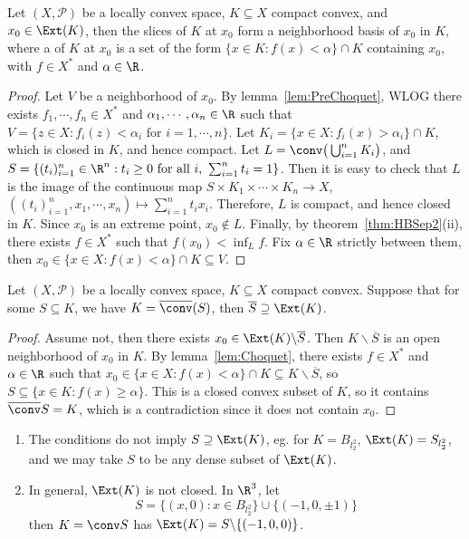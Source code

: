 \documentclass[a4paper]{article}
\begin{document}
\begin{nlemma}\label{lem:Choquet}
  Let $(X,\mathcal{P})$ be a locally convex space, $K\subseteq X$ compact convex, and $x_0\in\Ext(K)$, then the slices of $K$ at $x_0$ form a neighborhood basis of $x_0$ in $K$, where a  of $K$ at $x_0$ is a set of the form $\{x\in K:f(x)<\alpha\}\cap K$ containing $x_0$, with $f\in X^*$ and $\alpha\in\R$.
\end{nlemma}

\begin{proof}
  Let $V$ be a neighborhood of $x_0$. By lemma~\ref{lem:PreChoquet}, WLOG there exists $f_1,\cdots,f_n\in X^*$ and $\alpha_1,\cdots,\alpha_n\in\R$ such that $V=\{z\in X:f_i(z)<\alpha_i\text{ for }i=1,\cdots,n\}$. Let $K_i=\{x\in X:f_i(x)>\alpha_i\}\cap K$, which is closed in $K$, and hence compact. Let $L=\conv\big(\bigcup_{i=1}^n K_i\big)$, and $S=\{(t_i)_{i=1}^n\in\R^n:t_i\geq 0\text{ for all }i,\ \sum_{i=1}^n t_i=1\}$. Then it is easy to check that $L$ is the image of the continuous map $S\times K_1\times\cdots\times K_n\to X$, $((t_i)_{i=1}^n,x_1,\cdots,x_n)\mapsto\sum_{i=1}^n t_ix_i$. Therefore, $L$ is compact, and hence closed in $K$. Since $x_0$ is an extreme point, $x_0\notin L$. Finally, by theorem~\ref{thm:HBSep2}(ii), there exists $f\in X^*$ such that $f(x_0)<\inf_L f$. Fix $\alpha\in\R$ strictly between them, then $x_0\in\{x\in X:f(x)<\alpha\}\cap K\subseteq V$.
\end{proof}

\begin{nthm}\label{thm:KMConverse}
Let $(X,\mathcal{P})$ be a locally convex space, $K\subseteq X$ compact convex. Suppose that for some $S\subseteq K$, we have $K=\overline{\conv}(S)$, then $\overline{S}\supseteq\Ext(K)$.
\end{nthm}

\begin{proof}
  Assume not, then there exists $x_0\in\Ext(K)\backslash\overline{S}$. Then $K\backslash\overline{S}$ is an open neighborhood of $x_0$ in $K$. By lemma~\ref{lem:Choquet}, there exists $f\in X^*$ and $\alpha\in\R$ such that $x_0\in\{x\in X:f(x)<\alpha\}\cap K\subseteq K\backslash\overline{S}$, so $S\subseteq\{x\in K:f(x)\geq\alpha\}$. This is a closed convex subset of $K$, so it contains $\overline{\conv} S=K$, which is a contradiction since it does not contain $x_0$.
\end{proof}

\begin{remark}
	\begin{enumerate}[label=(\arabic*)]
		\item The conditions do not imply $S\supseteq\Ext(K)$, eg. for $K=B_{l_2^2}$, $\Ext(K)=S_{l_2^2}$, and we may take $S$ to be any dense subset of $\Ext(K)$.
		\item In general, $\Ext(K)$ is not closed. In $\R^3$, let
		\[S=\{(x,0):x\in B_{l_2^2}\}\cup\{(-1,0,\pm 1)\}\]
		then $K=\conv S$ has $\Ext(K)=S\backslash\{(-1,0,0)\}$.
	\end{enumerate}
\end{remark}
\end{document}
